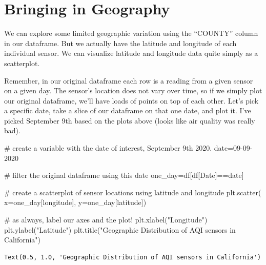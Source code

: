 \documentclass[
  letterpaper,
  DIV=11,
  numbers=noendperiod]{scrreprt}
\newenvironment{Shaded}{\begin{snugshade}}{\end{snugshade}}
\newcommand{\CommentTok}[1]{\textcolor[rgb]{0.37,0.37,0.37}{#1}}
\newcommand{\NormalTok}[1]{\textcolor[rgb]{0.00,0.23,0.31}{#1}}
\newcommand{\OperatorTok}[1]{\textcolor[rgb]{0.37,0.37,0.37}{#1}}
\newcommand{\StringTok}[1]{\textcolor[rgb]{0.13,0.47,0.30}{#1}}
\begin{document}
\hypertarget{bringing-in-geography}{%
\section{Bringing in Geography}\label{bringing-in-geography}}

We can explore some limited geographic variation using the ``COUNTY''
column in our dataframe. But we actually have the latitude and longitude
of each individual sensor. We can visualize latitude and longitude data
quite simply as a scatterplot.

Remember, in our original dataframe each row is a reading from a given
sensor on a given day. The sensor's location does not vary over time, so
if we simply plot our original dataframe, we'll have loads of points on
top of each other. Let's pick a specific date, take a slice of our
dataframe on that one date, and plot it. I've picked September 9th based
on the plots above (looks like air quality was really bad).

\begin{Shaded}
\begin{Highlighting}[]
\CommentTok{\# create a variable with the date of interest, September 9th 2020. }
\NormalTok{date}\OperatorTok{=}\StringTok{\textquotesingle{}09{-}09{-}2020\textquotesingle{}}

\CommentTok{\# filter the original dataframe using this date}
\NormalTok{one\_day}\OperatorTok{=}\NormalTok{df[df[}\StringTok{\textquotesingle{}Date\textquotesingle{}}\NormalTok{]}\OperatorTok{==}\NormalTok{date]}

\CommentTok{\# create a scatterplot of sensor locations using latitude and longitude }
\NormalTok{plt.scatter(}
\NormalTok{    x}\OperatorTok{=}\NormalTok{one\_day[}\StringTok{\textquotesingle{}longitude\textquotesingle{}}\NormalTok{],}
\NormalTok{    y}\OperatorTok{=}\NormalTok{one\_day[}\StringTok{\textquotesingle{}latitude\textquotesingle{}}\NormalTok{])}

\CommentTok{\# as always, label our axes and the plot!}
\NormalTok{plt.xlabel(}\StringTok{"Longitude"}\NormalTok{)}
\NormalTok{plt.ylabel(}\StringTok{"Latitude"}\NormalTok{)}
\NormalTok{plt.title(}\StringTok{"Geographic Distribution of AQI sensors in California"}\NormalTok{)}
\end{Highlighting}
\end{Shaded}

\begin{verbatim}
Text(0.5, 1.0, 'Geographic Distribution of AQI sensors in California')
\end{verbatim}
\end{document}
